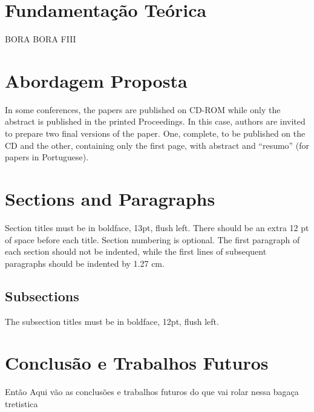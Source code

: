 \documentclass[12pt]{article}
\begin{document}
\section{Fundamentação Teórica} \label{sec:firstpage}

BORA BORA FIII

\section{Abordagem Proposta}

In some conferences, the papers are published on CD-ROM while only the
abstract is published in the printed Proceedings. In this case, authors are
invited to prepare two final versions of the paper. One, complete, to be
published on the CD and the other, containing only the first page, with
abstract and ``resumo'' (for papers in Portuguese).

\section{Sections and Paragraphs}

Section titles must be in boldface, 13pt, flush left. There should be an extra
12 pt of space before each title. Section numbering is optional. The first
paragraph of each section should not be indented, while the first lines of
subsequent paragraphs should be indented by 1.27 cm.

\subsection{Subsections}

The subsection titles must be in boldface, 12pt, flush left.



\section{Conclusão e Trabalhos Futuros}
Então Aqui vão as conclusões e trabalhos futuros do que vai rolar nessa bagaça tretistica



\end{document}
